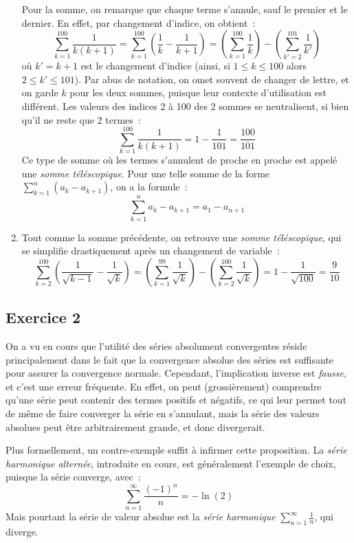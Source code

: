 \documentclass{article}
\begin{document}
\begin{enumerate}
    Pour la somme, on remarque que chaque terme s'annule, sauf le premier et le dernier. En effet, par changement d'indice, on obtient~:
    \[
    \sum_{k=1}^{100} \frac{1}{k(k+1)} = \sum_{k = 1}^{100} \left ( \frac{1}{k} - \frac{1}{k+1} \right ) = \left ( \sum_{k = 1}^{100} \frac{1}{k} \right ) - \left ( \sum_{k' = 2}^{101} \frac{1}{k'} \right )
    \]
    où $k' = k + 1$ est le changement d'indice (ainsi, si $1 \leq k \leq 100$ alors $2 \leq k' \leq 101$). Par abus de notation, on omet souvent de changer de lettre, et on garde $k$ pour les deux sommes, puisque leur contexte d'utilisation est différent. Les valeurs des indices 2 à 100 des 2 sommes se neutralisent, si bien qu'il ne reste que 2 termes~:
    \[
    \boxed{
    \sum_{k = 1}^{100} \frac{1}{k(k+1)} = 1 - \frac{1}{101} = \frac{100}{101}
    }
    \]
    Ce type de somme où les termes s'annulent de proche en proche est appelé une \emph{somme téléscopique}. Pour une telle somme de la forme $\displaystyle\sum_{k = 1}^{n} \left ( a_{k} - a_{k+1} \right )$, on a la formule~:
    \[
    \boxed{
    \sum_{k = 1}^{n} a_{k} - a_{k+1} = a_1 - a_{n+1}
    }
    \]
    
    \item Tout comme la somme précédente, on retrouve une \emph{somme téléscopique}, qui se simplifie drastiquement après un changement de variable~:
    \[
    \boxed{
    \sum_{k=2}^{100} \left( \frac{1}{\sqrt{k-1}} - \frac{1}{\sqrt{k}}\right ) = \left ( \sum_{k = 1}^{99} \frac{1}{\sqrt{k}}\right ) - \left (
    \sum_{k = 2}^{100} \frac{1}{\sqrt{k}} \right ) = 1 - \frac{1}{\sqrt{100}} = \frac{9}{10}
    }
    \]
\end{enumerate}

\subsection{Exercice 2}
On a vu en cours que l'utilité des séries absolument convergentes réside principalement dans le fait que la convergence absolue des séries est suffisante pour assurer la convergence normale. Cependant, l'implication inverse est \emph{fausse}, et c'est une erreur fréquente. En effet, on peut (grossièrement) comprendre qu'une série peut contenir des termes positifs et négatifs, ce qui leur permet tout de même de faire converger la série en s'annulant, mais la série des valeurs absolues peut être arbitrairement grande, et donc divergerait.

\noindent Plus formellement, un contre-exemple suffit à infirmer cette proposition. La \emph{série harmonique alternée}, introduite en cours, est généralement l'exemple de choix, puisque la série converge, avec~:
\[
\sum_{n = 1}^{\infty} \frac{(-1)^n}{n} = -\ln(2)
\]
Mais pourtant la série de valeur absolue est la \emph{série harmonique} $\displaystyle\sum_{n = 1}^{\infty} \frac{1}{n}$, qui diverge.
\end{document}
